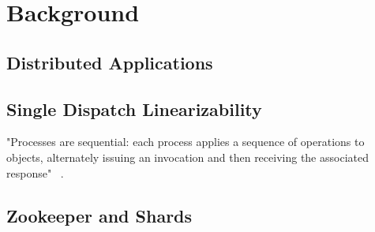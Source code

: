 \section{Background}
\label{sec:background}

\subsection{Distributed Applications}

\subsection{Single Dispatch Linearizability}
"Processes are sequential: each process applies a sequence
of operations to objects, alternately issuing an invocation and then receiving the
associated response" ~\cite{herlihy}.
\subsection{Zookeeper and Shards}